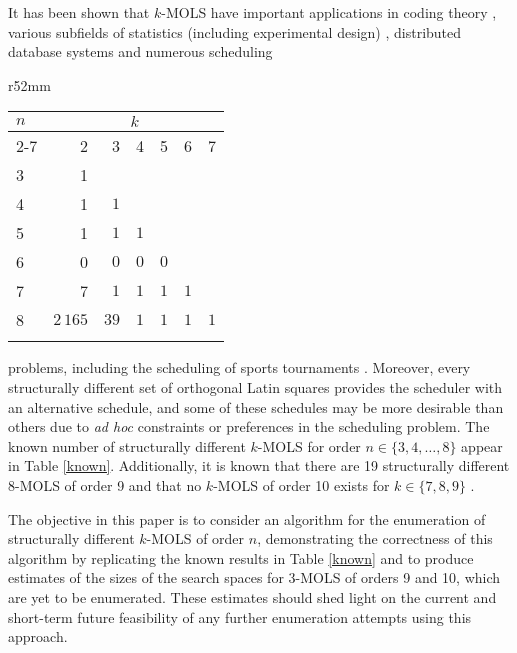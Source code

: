 \documentclass[11pt, a4paper]{article}
\newcommand{\lat}{Latin square}
\newcounter{ls}
\begin{document}
It has been shown that $k$-MOLS  have important applications in coding theory \cite{laywine}, various subfields of statistics (including experimental design)   \cite{fisher1, fisher2}, distributed database systems \cite{Abdel} and numerous scheduling
\begin{wraptable}{r}{52mm}
\begin{tabular}{lrrrrrr}
\toprule
 $n$ &  \multicolumn{6}{c}{$k$}\\ \cmidrule(lr){2-7}
 &  \multicolumn{1}{r}{2} & \multicolumn{1}{r}{3} &\multicolumn{1}{r}{4} & \multicolumn{1}{r}{5} & \multicolumn{1}{r}{6} & \multicolumn{1}{r}{7} \\ \midrule 
  3 & 1 &   &    &     &    &       \\ 
  4 & 1 & $1$ &    &     &    &       \\ 
  5& 1 & $1$ & $1$  &     &    &       \\
  6& 0 & $0$ & $0$  & $0$   &    &     \\
  7 & 7 & $1$ & $1$  & $1$   & $1$  &      \\ 
  8 & $2\,165$ & $39$ & $1$  & $1$   & $1$  & $1$    \\ \bottomrule \smallskip
\end{tabular}
\caption{The number of structurally different $k$-MOLS of order $n$ for $n \in \{3, 4,\ldots, 8$\}.}
\label{known}
\end{wraptable}   problems, including the scheduling  of sports tournaments  \cite{keedwell2000designing,kidd2010tabu,robinson}. Moreover,  every  structurally
     different set  of orthogonal \lat s provides  the scheduler with an alternative schedule, and some of these schedules may be more desirable than others due to \emph{ad hoc} constraints or preferences in the scheduling problem. The known number of structurally different $k$-MOLS for order $n\in\{3,4,\ldots, 8\}$ appear in Table \ref{known}. Additionally, it is known that there are 19 structurally different 8-MOLS of order 9 \cite{owens1995complete} and that no $k$-MOLS of order 10 exists for $k\in \{7,8,9 \}$ \cite{dukes2012group, lam1989non}.

The objective in this paper is to consider an algorithm for the enumeration of structurally different $k$-MOLS of order $n$, demonstrating  the correctness of this algorithm by replicating the known results in Table \ref{known} and to produce estimates of the sizes of  the search spaces for $3$-MOLS of orders 9 and 10, which are yet to be enumerated. These estimates should shed light on the current and short-term future feasibility of any further enumeration attempts using this approach.
\end{document}
